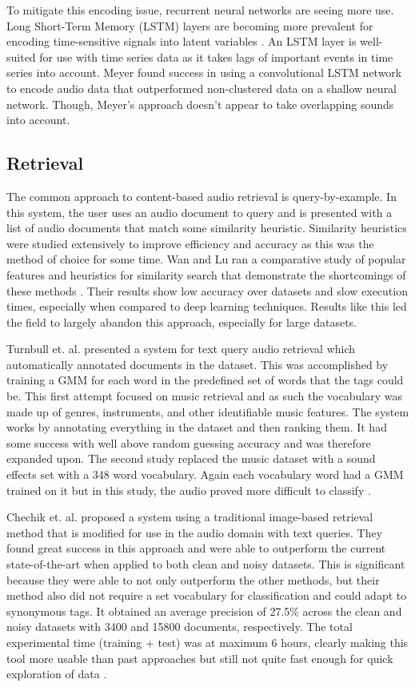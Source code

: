 To mitigate this encoding issue, recurrent neural networks are seeing more use. Long Short-Term Memory (LSTM) layers are becoming more prevalent for encoding time-sensitive signals into latent variables \cite{Meyer2017}. An LSTM layer is well-suited for use with time series data as it takes lags of important events in time series into account. Meyer found success in using a convolutional LSTM network to encode audio data that outperformed non-clustered data on a shallow neural network. Though, Meyer's approach doesn't appear to take overlapping sounds into account.

\subsection{Retrieval}
The common approach to content-based audio retrieval is query-by-example. In this system, the user uses an audio document to query and is presented with a list of audio documents that match some similarity heuristic. Similarity heuristics were studied extensively to improve efficiency and accuracy as this was the method of choice for some time. Wan and Lu ran a comparative study of popular features and heuristics for similarity search that demonstrate the shortcomings of these methods \cite{Wan2005}. Their results show low accuracy over datasets and slow execution times, especially when compared to deep learning techniques. Results like this led the field to largely abandon this approach, especially for large datasets.

Turnbull et. al. presented a system for text query audio retrieval which automatically annotated documents in the dataset. This was accomplished by training a GMM for each word in the predefined set of words that the tags could be. This first attempt focused on music retrieval and as such the vocabulary was made up of genres, instruments, and other identifiable music features. The system works by annotating everything in the dataset and then ranking them. It had some success with well above random guessing accuracy and was therefore expanded upon. The second study replaced the music dataset with a sound effects set with a 348 word vocabulary. Again each vocabulary word had a GMM trained on it but in this study, the audio proved more difficult to classify \cite{Turnbull2007, Turnbull2008}.

Chechik et. al. proposed a system using a traditional image-based retrieval method that is modified for use in the audio domain with text queries. They found great success in this approach and were able to outperform the current state-of-the-art when applied to both clean and noisy datasets. This is significant because they were able to not only outperform the other methods, but their method also did not require a set vocabulary for classification and could adapt to synonymous tags. It obtained an average precision of 27.5\% across the clean and noisy datasets with 3400 and 15800 documents, respectively. The total experimental time (training + test) was at maximum 6 hours, clearly making this tool more usable than past approaches but still not quite fast enough for quick exploration of data \cite{Chechik2008}.


